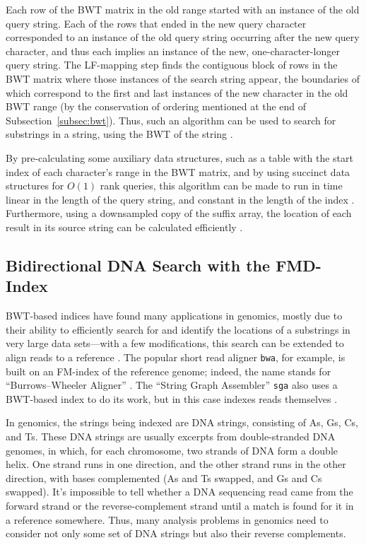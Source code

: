 Each row of the BWT matrix in the old range started with an instance of the old query string. Each of the rows that ended in the new query character corresponded to an instance of the old query string occurring after the new query character, and thus each implies an instance of the new, one-character-longer query string. The LF-mapping step finds the contiguous block of rows in the BWT matrix where those instances of the search string appear, the boundaries of which correspond to the first and last instances of the new character in the old BWT range (by the conservation of ordering mentioned at the end of Subsection~\ref{subsec:bwt}). Thus, such an algorithm can be used to search for substrings in a string, using the BWT of the string \cite{ferragina2000opportunistic}.

By pre-calculating some auxiliary data structures, such as a table with the start index of each character's range in the BWT matrix, and by using succinct data structures for $O(1)$ rank queries, this algorithm can be made to run in time linear in the length of the query string, and constant in the length of the index \cite{ferragina2000opportunistic}. Furthermore, using a downsampled copy of the suffix array, the location of each result in its source string can be calculated efficiently \cite{siren2009run}.

\subsection{Bidirectional DNA Search with the FMD-Index}

BWT-based indices have found many applications in genomics, mostly due to their ability to efficiently search for and identify the locations of a substrings in very large data sets---with a few modifications, this search can be extended to align reads to a reference \cite{li2014bwa}. The popular short read aligner \texttt{bwa}, for example, is built on an FM-index of the reference genome; indeed, the name stands for ``Burrows--Wheeler Aligner'' \cite{li2014bwa,li2009fast}. The ``String Graph Assembler'' \texttt{sga} also uses a BWT-based index to do its work, but in this case indexes reads themselves \cite{simpson2012efficient}.

In genomics, the strings being indexed are DNA strings, consisting of As, Gs, Cs, and Ts. These DNA strings are usually excerpts from double-stranded DNA genomes, in which, for each chromosome, two strands of DNA form a double helix. One strand runs in one direction, and the other strand runs in the other direction, with bases complemented (As and Ts swapped, and Gs and Cs swapped). It's impossible to tell whether a DNA sequencing read came from the forward strand or the reverse-complement strand until a match is found for it in a reference somewhere. Thus, many analysis problems in genomics need to consider not only some set of DNA strings but also their reverse complements.

